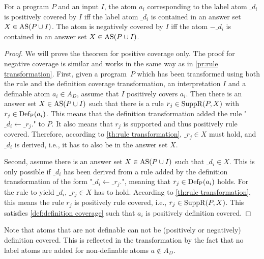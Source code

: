 \begin{theorem}
\label{th:definition transformation}
    For a program $P$ and an input $I$, the atom $a_i$ corresponding to the label atom $\_d_i$ is positively covered by $I$ iff the label atom $\_d_i$ is contained in an answer set \(X \in \operatorname{AS}(P \cup I)\). The atom is negatively covered by $I$ iff the atom $-\_d_i$ is contained in an answer set \(X \in \operatorname{AS}(P \cup I)\).
\end{theorem}

\begin{proof}
\label{pr:definition transformation}
    We will prove the theorem for positive coverage only. The proof for negative coverage is similar and works in the same way as in \cref{pr:rule transformation}.
    First, given a program~$P$ which has been transformed using both the rule and the definition coverage transformation, an interpretation $I$ and a definable atom \(a_i \in A_D\), assume that $I$ positively covers \(a_i\). Then there is an answer set \(X \in \operatorname{AS}(P \cup I)\) such that there is a rule \(r_j \in \operatorname{SuppR}(P, X)\) with \(r_j \in \operatorname{Def_P}(a_i)\). This means that the definition transformation added the rule "\(\_d_i \leftarrow \_r_j.\)" to $P$. It also means that $r_j$ is supported and thus positively rule covered. Therefore, according to \cref{th:rule transformation}, \(\_r_j \in X\) must hold, and $\_d_i$ is derived, i.e., it has to also be in the answer set $X$.

    Second, assume there is an answer set \(X \in \operatorname{AS}(P \cup I)\) such that \(\_d_i \in X\). This is only possible if $\_d_i$ has been derived from a rule added by the definition transformation of the form "\(\_d_i \leftarrow \_r_j.\)", meaning that \(r_j \in \operatorname{Def_P}(a_i)\) holds. For the rule to yield $\_d_i$, \(\_r_j \in X\) has to hold. According to \cref{th:rule transformation}, this means the rule $r_j$ is positively rule covered, i.e., \(r_j \in \operatorname{SuppR}(P, X)\). This satisfies \cref{def:definition coverage} such that $a_i$ is positively definition covered.
\end{proof}

Note that atoms that are not definable can not be (positively or negatively) definition covered. This is reflected in the transformation by the fact that no label atoms are added for non-definable atoms \(a \not\in A_D\).

